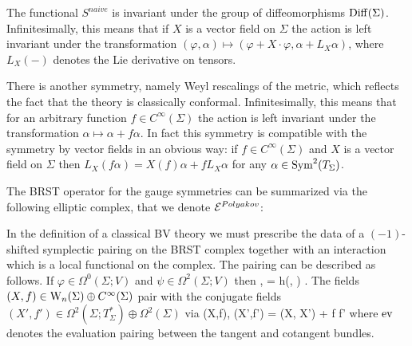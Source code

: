 The functional $S^{naive}$ is invariant under the group of diffeomorphisms ${\rm Diff}(\Sigma)$. Infinitesimally, this means that if $X$ is a vector field on $\Sigma$ the action is left invariant under the transformation $(\varphi,\alpha) \mapsto (\varphi + X \cdot \varphi, \alpha + L_X \alpha)$, where $L_X(-)$ denotes the Lie derivative on tensors. 

There is another symmetry, namely Weyl rescalings of the metric, which reflects the fact that the theory is classically conformal. Infinitesimally, this means that for an arbitrary function $f \in C^\infty(\Sigma)$ the action is left invariant under the transformation $\alpha \mapsto \alpha + f \alpha$. In fact this symmetry is compatible with the symmetry by vector fields in an obvious way: if $f \in C^\infty(\Sigma)$ and $X$ is a vector field on $\Sigma$ then $L_{X} (f \alpha) = X(f) \alpha + f L_X \alpha$ for any $\alpha \in {\rm Sym}^2(T_\Sigma)$. 

The BRST operator for the gauge symmetries can be summarized via the following elliptic complex, that we denote $\mathcal E^{Polyakov}$:

\ben
{}
\een 
In the definition of a classical BV theory we must prescribe the data of a $(-1)$-shifted symplectic pairing on the BRST complex together with an interaction which is a local functional on the complex. The pairing can be described as follows. If $\varphi \in \Omega^0(\Sigma ; V)$ and $\psi \in \Omega^2(\Sigma ; V)$ then
\ben
\<\varphi, \psi \> = \int h(\varphi, \psi) .
\een 
The fields $(X, f) \in {{\rm W}_n}(\Sigma) \oplus C^\infty(\Sigma)$ pair with the conjugate fields $(X', f') \in  \Omega^2(\Sigma ; T^*_\Sigma) \oplus \Omega^2(\Sigma)$ via
\ben
\<(X,f), (X',f')\> = \int \ev(X, X') + \int f f' 
\een
where ${\rm ev}$ denotes the evaluation pairing between the tangent and cotangent bundles. 


